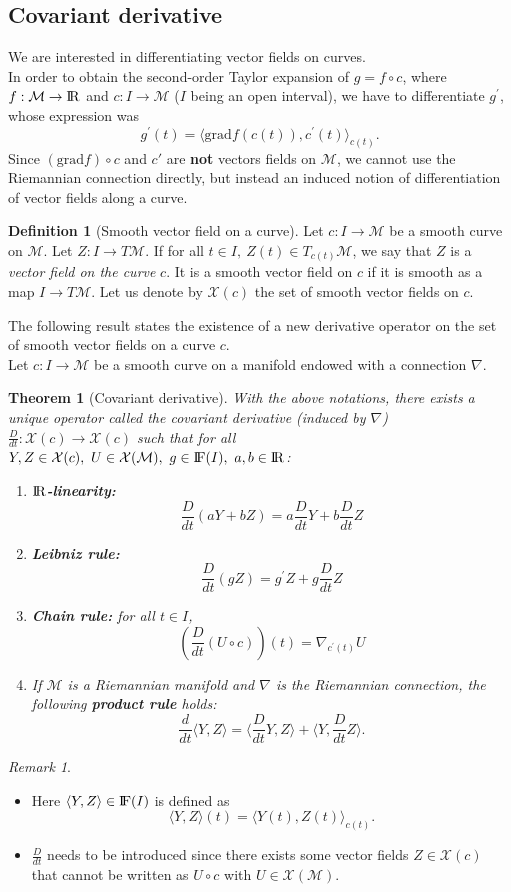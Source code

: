 \documentclass[10pt,a4paper]{book}
\theoremstyle{definition}
\newtheorem{defn}{Definition}[section]
\theoremstyle{plain}
\newtheorem{thm}{Theorem}[section]
\theoremstyle{remark}
\newtheorem{rmk}{Remark}[section]
\newcommand{\grad}{\textrm{grad}}
\newcommand \M {\mathcal{M}}
\newcommand \X {\mathcal{X}}
\def\R{{\rm I\kern-0.16em R}}
\def\F{{\rm I\kern-0.16em F}}
\begin{document}
\subsection{Covariant derivative}
We are interested in differentiating vector fields on curves. \\
In order to obtain the second-order Taylor expansion of $g=f\circ c$, where $f:\M \to \R$ and $c: I \to \M$ ($I$ being an open interval), we have to differentiate $g^{\prime}$, whose expression was
$$g^{\prime}(t)=\langle \grad f(c(t)),c^{\prime}(t)\rangle_{c(t)}.$$
Since $(\grad f) \circ c$ and $c'$ are \textbf{not} vectors fields on $\M$, we cannot use the Riemannian connection directly, but instead an induced notion of differentiation of vector fields along a curve.
\begin{defn}[Smooth vector field on a curve]
Let $c: I \to \M$ be a smooth curve on $\M$. Let $Z:I\to T\M$. If for all $t\in I,~Z(t) \in T_{c(t)}\M$, we say that $Z$ is a \emph{vector field on the curve }$c$. It is a smooth vector field on $c$ if it is smooth as a map $I\to T\M$. Let us denote by $\X(c)$ the set of smooth vector fields on $c$.
\end{defn}
The following result states the existence of a new derivative operator on the set of smooth vector fields on a curve $c$.\\ Let $c:I\to \M$ be a smooth curve on a manifold endowed with a connection $\nabla$.
\begin{thm}[Covariant derivative]
With the above notations, there exists a unique operator called the \emph{covariant derivative (induced by $\nabla$)} $\frac{D}{dt}:\X(c)\to \X(c)$ such that for all $Y,Z \in \X(c),~U\in \X(\M),~g\in \F(I),~a,b\in \R$:
\begin{enumerate}
\item \textbf{$\R$-linearity:} 
$$\frac{D}{dt}(aY+bZ)=a\frac{D}{dt}Y+b\frac{D}{dt}Z$$
\item \textbf{Leibniz rule:}
$$\frac{D}{dt}(gZ)=g^{\prime}Z+g\frac{D}{dt}Z$$
\item \textbf{Chain rule:} for all $t\in I$,
$$\left(\frac{D}{dt}(U\circ c)\right)(t)=\nabla_{c^{\prime}(t)}U$$
\item If $\M$ is a Riemannian manifold and $\nabla$ is the Riemannian connection, the following \textbf{product rule} holds:
$$\frac{d}{dt}\langle Y,Z\rangle=\langle \frac{D}{dt}Y,Z\rangle+\langle Y,\frac{D}{dt}Z\rangle.$$
\end{enumerate}
\end{thm}
\begin{rmk}~
\begin{itemize}
\item Here $\langle Y,Z\rangle \in \F(I)$ is defined as
$$\langle Y,Z\rangle (t)=\langle Y(t),Z(t)\rangle_{c(t)}.$$
\item $\frac{D}{dt}$ needs to be introduced since there exists some vector fields $Z\in \X(c)$ that cannot be written as $U\circ c$ with $U\in \X(\M)$.
\end{itemize}
\end{rmk}
\end{document}
